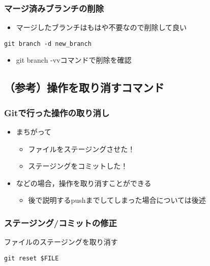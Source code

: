 \documentclass[a4paper,twoside,twocolumn]{bxjsarticle}
\begin{document}
\subsubsection{マージ済みブランチの削除}
\label{sec-1-6-8}

\begin{itemize}
\item マージしたブランチはもはや不要なので削除して良い
\end{itemize}

\begin{verbatim}
git branch -d new_branch
\end{verbatim}

\begin{itemize}
\item git branch -vvコマンドで削除を確認
\end{itemize}

\subsection{（参考）操作を取り消すコマンド}
\label{sec-1-7}
\subsubsection{Gitで行った操作の取り消し}
\label{sec-1-7-1}
\begin{itemize}
\item まちがって
\begin{itemize}
\item ファイルをステージングさせた！
\item ステージングをコミットした！
\end{itemize}
\item などの場合，操作を取り消すことができる
\begin{itemize}
\item 後で説明するpushまでしてしまった場合については後述
\end{itemize}
\end{itemize}

\subsubsection{ステージング/コミットの修正}
\label{sec-1-7-2}
ファイルのステージングを取り消す

\begin{verbatim}
git reset $FILE
\end{verbatim}
\end{document}
